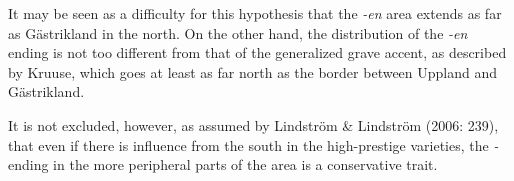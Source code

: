 
It may be seen as a difficulty for this hypothesis that the \textit{{}-en} area extends as far as Gästrikland in the north. On the other hand, the distribution of the \textit{{}-}\textit{en} ending is not too different from that of the generalized grave accent, as described by Kruuse, which goes at least as far north as the border between Uppland and Gästrikland.


It is not excluded, however, as assumed by Lindström \& Lindström (2006: 239), that even if there is influence from the south in the high-prestige varieties, the\textit{ {}-} ending in the more peripheral parts of the area is a conservative trait.


